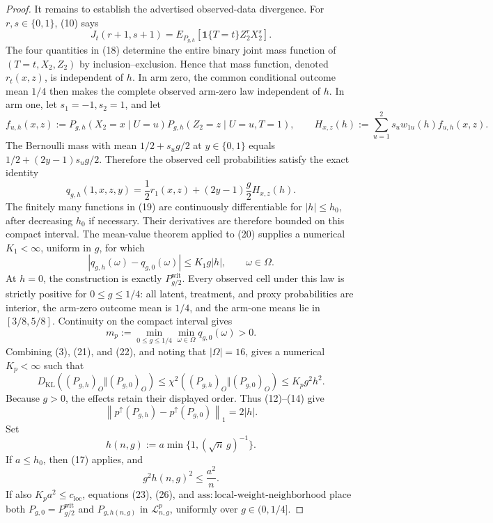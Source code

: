 \documentclass{article}
\begin{document}
\begin{proof}
It remains to establish the advertised observed-data divergence.  For \(r,s\in\{0,1\}\), (10) says
\[
 J_t(r+1,s+1)
 =E_{P_{g,h}}\!\left[\mathbf 1\{T=t\}Z_2^rX_2^s\right].                         \tag{18}
\]
The four quantities in (18) determine the entire binary joint mass function of \((T=t,X_2,Z_2)\) by inclusion--exclusion.  Hence that mass function, denoted \(r_t(x,z)\), is independent of \(h\).  In arm zero, the common conditional outcome mean \(1/4\) then makes the complete observed arm-zero law independent of \(h\).  In arm one, let \(s_1=-1,s_2=1\), and let
\[
 f_{u,h}(x,z):=P_{g,h}(X_2=x\mid U=u)
               P_{g,h}(Z_2=z\mid U=u,T=1),
 \qquad
 H_{x,z}(h):=\sum_{u=1}^2s_u w_{1u}(h)f_{u,h}(x,z).                              \tag{19}
\]
The Bernoulli mass with mean \(1/2+s_ug/2\) at \(y\in\{0,1\}\) equals \(1/2+(2y-1)s_ug/2\).  Therefore the observed cell probabilities satisfy the exact identity
\[
 q_{g,h}(1,x,z,y)
 =\frac12r_1(x,z)+(2y-1)\frac g2 H_{x,z}(h).                                     \tag{20}
\]
The finitely many functions in (19) are continuously differentiable for \(|h|\le h_0\), after decreasing \(h_0\) if necessary.  Their derivatives are therefore bounded on this compact interval.  The mean-value theorem applied to (20) supplies a numerical \(K_1<\infty\), uniform in \(g\), for which
\[
 |q_{g,h}(\omega)-q_{g,0}(\omega)|\le K_1g|h|,
 \qquad \omega\in\Omega.                                                        \tag{21}
\]
At \(h=0\), the construction is exactly \(P_{g/2}^{\mathrm{wit}}\).  Every observed cell under this law is strictly positive for \(0\le g\le1/4\): all latent, treatment, and proxy probabilities are interior, the arm-zero outcome mean is \(1/4\), and the arm-one means lie in \([3/8,5/8]\).  Continuity on the compact interval gives
\[
 m_p:=\min_{0\le g\le1/4}\min_{\omega\in\Omega}q_{g,0}(\omega)>0.             \tag{22}
\]
Combining (3), (21), and (22), and noting that \(|\Omega|=16\), gives a numerical \(K_p<\infty\) such that
\[
 D_{\mathrm{KL}}\!\left((P_{g,h})_O\Vert(P_{g,0})_O\right)
 \le\chi^2\!\left((P_{g,h})_O\Vert(P_{g,0})_O\right)
 \le K_pg^2h^2.                                                                   \tag{23}
\]
Because \(g>0\), the effects retain their displayed order.  Thus (12)--(14) give
\[
 \left\lVert p^\uparrow(P_{g,h})-p^\uparrow(P_{g,0})\right\rVert_1=2|h|.         \tag{24}
\]
Set
\[
 h(n,g):=a\min\{1,(\sqrt n\,g)^{-1}\}.                                          \tag{25}
\]
If \(a\le h_0\), then (17) applies, and
\[
 g^2h(n,g)^2\le\frac{a^2}{n}.                                                     \tag{26}
\]
If also \(K_pa^2\le c_{\mathrm{loc}}\), equations (23), (26), and \(\mathrm{ass:local\text{-}weight\text{-}neighborhood}\) place both \(P_{g,0}=P_{g/2}^{\mathrm{wit}}\) and \(P_{g,h(n,g)}\) in \(\mathcal L_{n,g}^p\), uniformly over \(g\in(0,1/4]\).


\end{proof}
\end{document}
